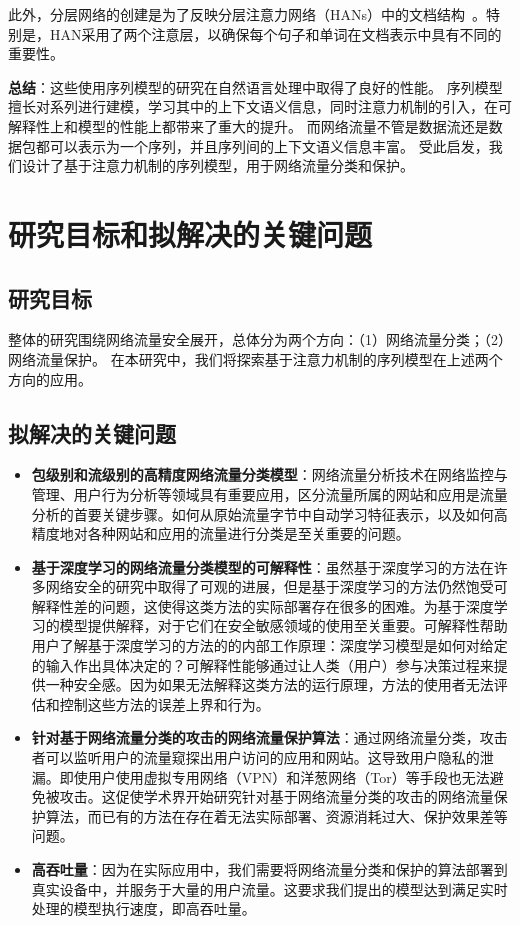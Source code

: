 \documentclass[degree=master,cjk-font=noto]{thuthesis}
\begin{document}
此外，分层网络的创建是为了反映分层注意力网络（HANs）中的文档结构~\cite{b29}。特别是，HAN采用了两个注意层，以确保每个句子和单词在文档表示中具有不同的重要性。

\textbf{总结}：这些使用序列模型的研究在自然语言处理中取得了良好的性能。
序列模型擅长对系列进行建模，学习其中的上下文语义信息，同时注意力机制的引入，在可解释性上和模型的性能上都带来了重大的提升。
而网络流量不管是数据流还是数据包都可以表示为一个序列，并且序列间的上下文语义信息丰富。
受此启发，我们设计了基于注意力机制的序列模型，用于网络流量分类和保护。

\chapter{研究目标和拟解决的关键问题}

\section{研究目标}

整体的研究围绕网络流量安全展开，总体分为两个方向：（1）网络流量分类；（2）网络流量保护。
在本研究中，我们将探索基于注意力机制的序列模型在上述两个方向的应用。

\section{拟解决的关键问题}

\begin{itemize}
	\item \textbf{包级别和流级别的高精度网络流量分类模型}：网络流量分析技术在网络监控与管理、用户行为分析等领域具有重要应用，区分流量所属的网站和应用是流量分析的首要关键步骤。如何从原始流量字节中自动学习特征表示，以及如何高精度地对各种网站和应用的流量进行分类是至关重要的问题。
	\item \textbf{基于深度学习的网络流量分类模型的可解释性}：虽然基于深度学习的方法在许多网络安全的研究中取得了可观的进展，但是基于深度学习的方法仍然饱受可解释性差的问题，这使得这类方法的实际部署存在很多的困难。为基于深度学习的模型提供解释，对于它们在安全敏感领域的使用至关重要。可解释性帮助用户了解基于深度学习的方法的的内部工作原理：深度学习模型是如何对给定的输入作出具体决定的？可解释性能够通过让人类（用户）参与决策过程来提供一种安全感。因为如果无法解释这类方法的运行原理，方法的使用者无法评估和控制这些方法的误差上界和行为。
	\item \textbf{针对基于网络流量分类的攻击的网络流量保护算法}：通过网络流量分类，攻击者可以监听用户的流量窥探出用户访问的应用和网站。这导致用户隐私的泄漏。即使用户使用虚拟专用网络（VPN）和洋葱网络（Tor）等手段也无法避免被攻击。这促使学术界开始研究针对基于网络流量分类的攻击的网络流量保护算法，而已有的方法在存在着无法实际部署、资源消耗过大、保护效果差等问题。
	\item \textbf{高吞吐量}：因为在实际应用中，我们需要将网络流量分类和保护的算法部署到真实设备中，并服务于大量的用户流量。这要求我们提出的模型达到满足实时处理的模型执行速度，即高吞吐量。
\end{itemize}
\end{document}
